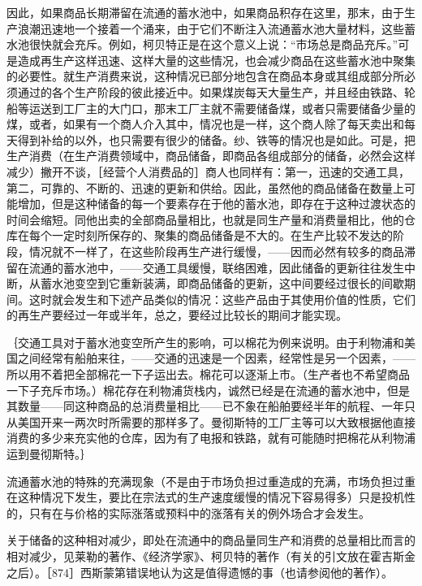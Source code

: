 因此，如果商品长期滞留在流通的蓄水池中，如果商品积存在这里，那末，由于生产浪潮迅速地一个接着一个涌来，由于它们不断注入流通蓄水池大量材料，这些蓄水池很快就会充斥。例如，柯贝特正是在这个意义上说：“市场总是商品充斥。”可是造成再生产这样迅速、这样大量的这些情况，也会减少商品在这些蓄水池中聚集的必要性。就生产消费来说，这种情况已部分地包含在商品本身或其组成部分所必须通过的各个生产阶段的彼此接近中。如果煤炭每天大量生产，并且经由铁路、轮船等运送到工厂主的大门口，那末工厂主就不需要储备煤，或者只需要储备少量的煤，或者，如果有一个商人介入其中，情况也是一样，这个商人除了每天卖出和每天得到补给的以外，也只需要有很少的储备。纱、铁等的情况也是如此。可是，把生产消费（在生产消费领域中，商品储备，即商品各组成部分的储备，必然会这样减少）撇开不谈，［经营个人消费品的］商人也同样有：第一，迅速的交通工具，第二，可靠的、不断的、迅速的更新和供给。因此，虽然他的商品储备在数量上可能增加，但是这种储备的每一个要素存在于他的蓄水池，即存在于这种过渡状态的时间会缩短。同他出卖的全部商品量相比，也就是同生产量和消费量相比，他的仓库在每个一定时刻所保存的、聚集的商品储备是不大的。在生产比较不发达的阶段，情况就不一样了，在这些阶段再生产进行缓慢，——因而必然有较多的商品滞留在流通的蓄水池中，——交通工具缓慢，联络困难，因此储备的更新往往发生中断，从蓄水池变空到它重新装满，即商品储备的更新，这中间要经过很长的间歇期间。这时就会发生和下述产品类似的情况：这些产品由于其使用价值的性质，它们的再生产要经过一年或半年，总之，要经过比较长的期间才能实现。

｛交通工具对于蓄水池变空所产生的影响，可以棉花为例来说明。由于利物浦和美国之间经常有船舶来往，——交通的迅速是一个因素，经常性是另一个因素，——所以用不着把全部棉花一下子运出去。棉花可以逐渐上市。（生产者也不希望商品一下子充斥市场。）棉花存在利物浦货栈内，诚然已经是在流通的蓄水池中，但是其数量——同这种商品的总消费量相比——已不象在船舶要经半年的航程、一年只从美国开来一两次时所需要的那样多了。曼彻斯特的工厂主等可以大致根据他直接消费的多少来充实他的仓库，因为有了电报和铁路，就有可能随时把棉花从利物浦运到曼彻斯特。｝

流通蓄水池的特殊的充满现象（不是由于市场负担过重造成的充满，市场负担过重在这种情况下发生，要比在宗法式的生产速度缓慢的情况下容易得多）只是投机性的，只有在与价格的实际涨落或预料中的涨落有关的例外场合才会发生。

关于储备的这种相对减少，即处在流通中的商品量同生产和消费的总量相比而言的相对减少，见莱勒的著作、《经济学家》、柯贝特的著作（有关的引文放在霍吉斯金之后）。［874］西斯蒙第错误地认为这是值得遗憾的事（也请参阅他的著作）。


